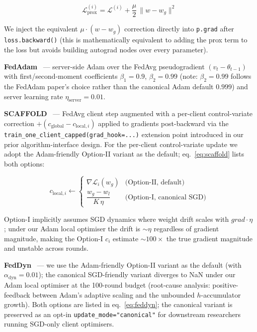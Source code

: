 \documentclass[journal]{IEEEtran}
\newcommand{\alphadyn}{\ensuremath{\alpha_{\mathrm{dyn}}}}
\begin{document}
\begin{equation}\label{eq:fedprox}
  \mathcal{L}_{\mathrm{prox}}^{(i)} = \mathcal{L}^{(i)} + \frac{\mu}{2}\,\bigl\lVert w - w_g \bigr\rVert^2
\end{equation}

We inject the equivalent $\mu \cdot (w - w_g)$ correction directly into \lstinline|p.grad| after \lstinline|loss.backward()| (this is mathematically equivalent to adding the prox term to the loss but avoids building autograd nodes over every parameter).

\textbf{FedAdam}~\cite{Reddi2021_FedAdam} --- server-side Adam over the FedAvg pseudogradient $(v_t - \theta_{t-1})$ with first/second-moment coefficients $\beta_1 = 0.9$, $\beta_2 = 0.99$ (note: $\beta_2 = 0.99$ follows the FedAdam paper's choice rather than the canonical Adam default $0.999$) and server learning rate $\eta_{\mathrm{server}} = 0.01$.

\textbf{SCAFFOLD}~\cite{Karimireddy2020_SCAFFOLD} --- FedAvg client step augmented with a per-client control-variate correction $+(c_{\mathrm{global}} - c_{\mathrm{local},i})$ applied to gradients post-backward via the \lstinline|train_one_client_capped(grad_hook=...)| extension point introduced in our prior algorithm-interface design. For the per-client control-variate update we adopt the Adam-friendly Option-II variant as the default; eq.~\eqref{eq:scaffold} lists both options:

\begin{equation}\label{eq:scaffold}
  c_{\mathrm{local},i} \leftarrow
  \begin{cases}
    \nabla \mathcal{L}_i(w_g) & \text{(Option-II, default)} \\
    \dfrac{w_g - w_l}{K \, \eta} & \text{(Option-I, canonical SGD)}
  \end{cases}
\end{equation}

Option-I implicitly assumes SGD dynamics where weight drift scales with $\mathit{grad} \cdot \eta$; under our Adam local optimiser the drift is $\sim \eta$ regardless of gradient magnitude, making the Option-I $c_i$ estimate $\sim 100\times$ the true gradient magnitude and unstable across rounds.

\textbf{FedDyn}~\cite{Acar2021_FedDyn} --- we use the Adam-friendly Option-II variant as the default (with $\alphadyn = 0.01$); the canonical SGD-friendly variant diverges to NaN under our Adam local optimiser at the 100-round budget (root-cause analysis: positive-feedback between Adam's adaptive scaling and the unbounded $h$-accumulator growth). Both options are listed in eq.~\eqref{eq:feddyn}; the canonical variant is preserved as an opt-in \lstinline|update_mode="canonical"| for downstream researchers running SGD-only client optimisers.
\end{document}
